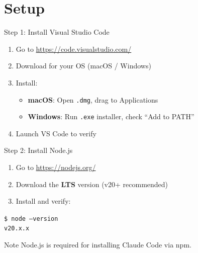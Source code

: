 \documentclass[aspectratio=169,xcolor=dvipsnames]{beamer}
\begin{document}
\section{Setup}

\begin{frame}{Step 1: Install Visual Studio Code}
  \begin{enumerate}
    \item Go to \url{https://code.visualstudio.com/}
    \item Download for your OS (macOS / Windows)
    \item Install:
      \begin{itemize}
        \item \textbf{macOS}: Open \texttt{.dmg}, drag to Applications
        \item \textbf{Windows}: Run \texttt{.exe} installer, check ``Add to PATH''
      \end{itemize}
    \item Launch VS Code to verify
  \end{enumerate}
\end{frame}

\begin{frame}{Step 2: Install Node.js}
  \begin{enumerate}
    \item Go to \url{https://nodejs.org/}
    \item Download the \textbf{LTS} version (v20+ recommended)
    \item Install and verify:
  \end{enumerate}

  \vspace{0.5em}
  \begin{center}
    \colorbox{codebg}{%
      \parbox{0.6\textwidth}{%
        \texttt{\textcolor{codegreen}{\$ node --version}}\\
        \texttt{\textcolor{codetext}{v20.x.x}}
      }%
    }
  \end{center}

  \vspace{0.5em}
  \begin{alertblock}{Note}
    Node.js is required for installing Claude Code via npm.
  \end{alertblock}
\end{frame}
\end{document}
